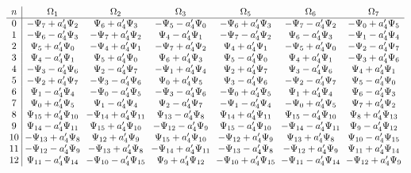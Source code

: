 \documentclass[11pt]{article}
\begin{document}
\[
\arraycolsep=3pt
\begin{array}{c|cccccc}
n & \Omega_1 & \Omega_2 & \Omega_3 & \Omega_5 & \Omega_6 & \Omega_7 \\ \hline
0 & -\Psi_{7}+a_4'\Psi_{2} & \Psi_{6}+a_4'\Psi_{3} & -\Psi_{5}-a_4'\Psi_{0} & -\Psi_{6}+a_4'\Psi_{3} & -\Psi_{7}-a_4'\Psi_{2} & -\Psi_{0}+a_4'\Psi_{5} \\
1 & -\Psi_{6}-a_4'\Psi_{3} & -\Psi_{7}+a_4'\Psi_{2} & \Psi_{4}-a_4'\Psi_{1} & -\Psi_{7}-a_4'\Psi_{2} & \Psi_{6}-a_4'\Psi_{3} & -\Psi_{1}-a_4'\Psi_{4} \\
2 & \Psi_{5}+a_4'\Psi_{0} & -\Psi_{4}+a_4'\Psi_{1} & -\Psi_{7}+a_4'\Psi_{2} & \Psi_{4}+a_4'\Psi_{1} & -\Psi_{5}+a_4'\Psi_{0} & -\Psi_{2}-a_4'\Psi_{7} \\
3 & \Psi_{4}-a_4'\Psi_{1} & \Psi_{5}+a_4'\Psi_{0} & \Psi_{6}+a_4'\Psi_{3} & \Psi_{5}-a_4'\Psi_{0} & \Psi_{4}+a_4'\Psi_{1} & -\Psi_{3}+a_4'\Psi_{6} \\
4 & -\Psi_{3}-a_4'\Psi_{6} & \Psi_{2}-a_4'\Psi_{7} & -\Psi_{1}+a_4'\Psi_{4} & \Psi_{2}+a_4'\Psi_{7} & \Psi_{3}-a_4'\Psi_{6} & \Psi_{4}+a_4'\Psi_{1} \\
5 & -\Psi_{2}+a_4'\Psi_{7} & -\Psi_{3}-a_4'\Psi_{6} & \Psi_{0}+a_4'\Psi_{5} & \Psi_{3}-a_4'\Psi_{6} & -\Psi_{2}-a_4'\Psi_{7} & \Psi_{5}-a_4'\Psi_{0} \\
6 & \Psi_{1}-a_4'\Psi_{4} & -\Psi_{0}-a_4'\Psi_{5} & -\Psi_{3}-a_4'\Psi_{6} & -\Psi_{0}+a_4'\Psi_{5} & \Psi_{1}+a_4'\Psi_{4} & \Psi_{6}-a_4'\Psi_{3} \\
7 & \Psi_{0}+a_4'\Psi_{5} & \Psi_{1}-a_4'\Psi_{4} & \Psi_{2}-a_4'\Psi_{7} & -\Psi_{1}-a_4'\Psi_{4} & -\Psi_{0}+a_4'\Psi_{5} & \Psi_{7}+a_4'\Psi_{2} \\
8 & \Psi_{15}+a_4'\Psi_{10} & -\Psi_{14}+a_4'\Psi_{11} & \Psi_{13}-a_4'\Psi_{8} & \Psi_{14}+a_4'\Psi_{11} & \Psi_{15}-a_4'\Psi_{10} & \Psi_{8}+a_4'\Psi_{13} \\
9 & \Psi_{14}-a_4'\Psi_{11} & \Psi_{15}+a_4'\Psi_{10} & -\Psi_{12}-a_4'\Psi_{9} & \Psi_{15}-a_4'\Psi_{10} & -\Psi_{14}-a_4'\Psi_{11} & \Psi_{9}-a_4'\Psi_{12} \\
10 & -\Psi_{13}+a_4'\Psi_{8} & \Psi_{12}+a_4'\Psi_{9} & \Psi_{15}+a_4'\Psi_{10} & -\Psi_{12}+a_4'\Psi_{9} & \Psi_{13}+a_4'\Psi_{8} & \Psi_{10}-a_4'\Psi_{15} \\
11 & -\Psi_{12}-a_4'\Psi_{9} & -\Psi_{13}+a_4'\Psi_{8} & -\Psi_{14}+a_4'\Psi_{11} & -\Psi_{13}-a_4'\Psi_{8} & -\Psi_{12}+a_4'\Psi_{9} & \Psi_{11}+a_4'\Psi_{14} \\
12 & \Psi_{11}-a_4'\Psi_{14} & -\Psi_{10}-a_4'\Psi_{15} & \Psi_{9}+a_4'\Psi_{12} & -\Psi_{10}+a_4'\Psi_{15} & -\Psi_{11}-a_4'\Psi_{14} & -\Psi_{12}+a_4'\Psi_{9} \\

\end{array}\]
\end{document}
